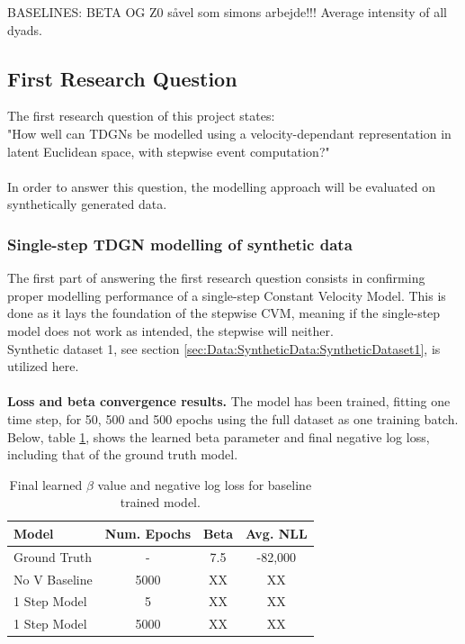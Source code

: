 
BASELINES: BETA OG Z0 såvel som simons arbejde!!! Average intensity of all dyads. 

\subsection{First Research Question}
\label{sec:ResearchQuestion1}
The first research question of this project states:
\\
"How well can TDGNs be modelled using a velocity-dependant representation in latent Euclidean space, with stepwise event computation?"
\\\\
In order to answer this question, the modelling approach will be evaluated on synthetically generated data.


\subsubsection{Single-step TDGN modelling of synthetic data}
\label{sec:ResearchQuestion1:singleStepSynthetic}
The first part of answering the first research question consists in confirming proper modelling performance of a single-step Constant Velocity Model. 
This is done as it lays the foundation of the stepwise CVM, meaning if the single-step model does not work as intended, the stepwise will neither.
\\
Synthetic dataset 1, see section \ref{sec:Data:SyntheticData:SyntheticDataset1}, is utilized here.
\\\\
\textbf{Loss and beta convergence results.}
The model has been trained, fitting one time step, for 50, 500 and 500 epochs using the full dataset as one training batch.
Below, table \ref{tab:SingleStep1}, shows the learned beta parameter and final negative log loss, including that of the ground truth model.

\begin{table}[H]
\centering
\begin{tabular}{|l|c|cc|}
\hline
Model         & \multicolumn{1}{l|}{Num. Epochs} & Beta & Avg. NLL \\ \hline
Ground Truth  & -                                & 7.5  & -82,000  \\
No V Baseline & 5000                             & XX   & XX       \\
1 Step Model  & 5                                & XX   & XX       \\
1 Step Model  & 5000                             & XX   & XX       \\ \hline
\end{tabular}
\caption{Final learned $\beta$ value and negative log loss for baseline trained model.}
\label{tab:SingleStep1}
\end{table}

